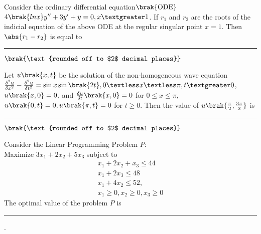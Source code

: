 \item{
Consider the ordinary differential equation$\brak{\text{ODE}}$ $4\brak{lnx}y^{\prime\prime}+3y^{\prime}+y=0,x\textgreater 1$. If $r_1$ and $r_2$ are the roots of the indicial equation of the above ODE at the regular singular point $x=1$. Then $\abs{r_1-r_2}$ is equal to\rule{2cm}{0.15mm}$\brak{\text{rounded off to $2$ decimal places}}$\\
}
\item{
Let $u\brak{x,t}$ be the solution of the non-homogeneous wave equation\\ $\frac{\delta^2u}{\delta x^2}-\frac{\delta^2 u}{\delta t^2}=\sin x\sin\brak{2t},0\textless x\textless\pi,t\textgreater 0$,$u\brak{x,0}=0$, and $\frac{\delta u}{\delta t}\brak{x,0}=0$ for $0\leq x\leq\pi$, 
 $u\brak{0,t}=0,u\brak{\pi,t}=0$ for $t\geq 0$.
Then the value of $u\brak{\frac{\pi}{2},\frac{3\pi}{2}}$ is\rule{2cm}{0.15mm}$\brak{\text{rounded off to $2$ decimal places}}$
}
\item{
Consider the Linear Programming Problem $P$:\\ Maximize $3x_1+2x_2+5x_3$ subject to 
\begin{align}
    x_1+2x_2+x_3\leq 44\\
    x_1+2x_3\leq 48\\
    x_1+4x_2\leq 52,\\
    x_1\geq 0,x_2\geq 0, x_3\geq 0
\end{align}
The optimal value of the problem $P$ is \rule{2cm}{0.15mm}.
}

